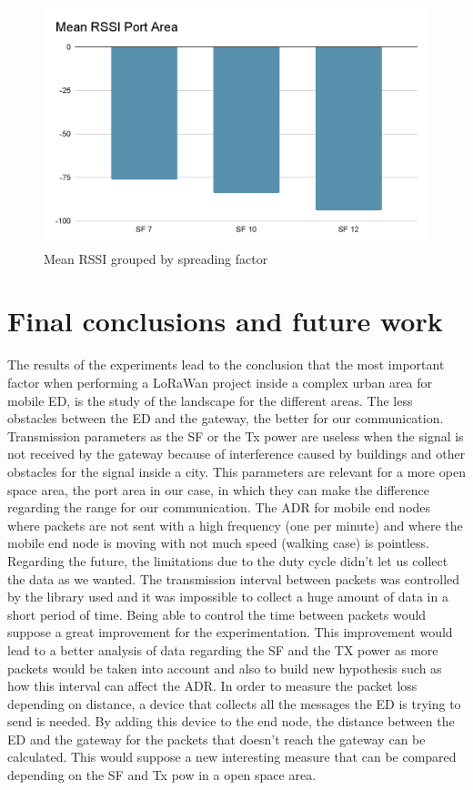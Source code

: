 \begin{figure}
\includegraphics[width=\linewidth]{rssiSpreading.png}
\caption{Mean RSSI grouped by spreading factor}
\label{conc:rssiSp}
\end{figure}

\section{Final conclusions and future work}

The results of the experiments lead to the conclusion that the most important factor when performing a LoRaWan project inside a complex urban area for mobile ED, is the study of the landscape for the different areas. The less obstacles between the ED and the gateway, the better for our communication.
Transmission parameters as the SF or the Tx power are useless when the signal is not received by the gateway because of interference caused by buildings and other obstacles for the signal inside a city. This parameters are relevant for a more open space area, the port area in our case, in which they can make the difference regarding the range for our communication.
The ADR for mobile end nodes where packets are not sent with a high frequency (one per minute) and where the mobile end node is moving with not much speed (walking case) is pointless.
Regarding the future, the limitations due to the duty cycle didn't let us collect the data as we wanted. The transmission interval between packets was controlled by the library used and it was impossible to collect a huge amount of data in a short period of time. Being able to control the time between packets would suppose a great improvement for the experimentation. This improvement would lead to a better analysis of  data regarding the SF and the TX power as more packets would be taken into account and also to build new hypothesis such as how this interval can affect the ADR. 
In order to measure the packet loss depending on distance, a device that collects all the messages the ED is trying to send is needed. By adding this device to the end node, the distance between the ED and the gateway for the packets that doesn't reach the gateway can be calculated. This would suppose a new interesting measure that can be compared depending on the SF and Tx pow in a open space area.




